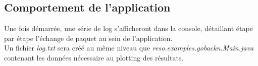 \documentclass[]{article}
\begin{document}
\subsection{Comportement de l'application}
Une fois démarrée, une série de log s'afficheront dans la console, détaillant étape par étape l'échange de paquet au sein de l'application.\\
Un fichier \emph{log.txt} sera créé au même niveau que \emph{reso.examples.gobackn.Main.java} contenant les données nécessaire au plotting des résultats.
\end{document}
